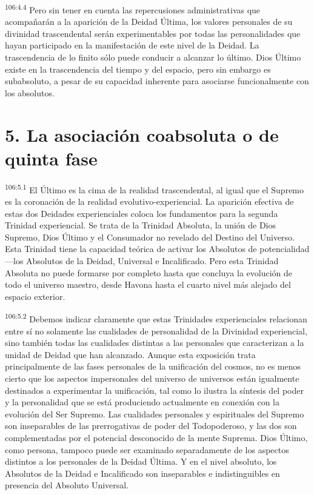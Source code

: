\documentclass[twoside, 11pt]{book}
\begin{document}
\par
\textsuperscript{106:4.4} Pero sin tener en cuenta las repercusiones administrativas que acompañarán a la aparición de la Deidad Última, los valores personales de su divinidad trascendental serán experimentables por todas las personalidades que hayan participado en la manifestación de este nivel de la Deidad. La trascendencia de lo finito sólo puede conducir a alcanzar lo último. Dios Último existe en la trascendencia del tiempo y del espacio, pero sin embargo es subabsoluto, a pesar de su capacidad inherente para asociarse funcionalmente con los absolutos.

\section*{5. La asociación coabsoluta o de quinta fase}
\par
\textsuperscript{106:5.1} El Último es la cima de la realidad trascendental, al igual que el Supremo es la coronación de la realidad evolutivo-experiencial. La aparición efectiva de estas dos Deidades experienciales coloca los fundamentos para la segunda Trinidad experiencial. Se trata de la Trinidad Absoluta, la unión de Dios Supremo, Dios Último y el Consumador no revelado del Destino del Universo. Esta Trinidad tiene la capacidad teórica de activar los Absolutos de potencialidad ---los Absolutos de la Deidad, Universal e Incalificado. Pero esta Trinidad Absoluta no puede formarse por completo hasta que concluya la evolución de todo el universo maestro, desde Havona hasta el cuarto nivel más alejado del espacio exterior.

\par
\textsuperscript{106:5.2} Debemos indicar claramente que estas Trinidades experienciales relacionan entre sí no solamente las cualidades de personalidad de la Divinidad experiencial, sino también todas las cualidades distintas a las personales que caracterizan a la unidad de Deidad que han alcanzado. Aunque esta exposición trata principalmente de las fases personales de la unificación del cosmos, no es menos cierto que los aspectos impersonales del universo de universos están igualmente destinados a experimentar la unificación, tal como lo ilustra la síntesis del poder y la personalidad que se está produciendo actualmente en conexión con la evolución del Ser Supremo. Las cualidades personales y espirituales del Supremo son inseparables de las prerrogativas de poder del Todopoderoso, y las dos son complementadas por el potencial desconocido de la mente Suprema. Dios Último, como persona, tampoco puede ser examinado separadamente de los aspectos distintos a los personales de la Deidad Última. Y en el nivel absoluto, los Absolutos de la Deidad e Incalificado son inseparables e indistinguibles en presencia del Absoluto Universal.
\end{document}
